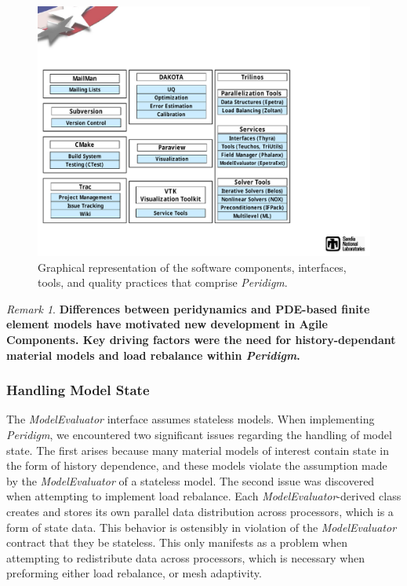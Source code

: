 \documentclass[pdf,ps2pdf,12pt,report]{SANDreport}
\theoremstyle{plain}
\theoremstyle{definition}
\theoremstyle{remark}
\newtheorem{rem}{Remark}[section]
\numberwithin{equation}{section}
\begin{document}
\begin{figure}[h!]
\begin{center}
	\includegraphics[width=\linewidth]{PeridigmComponents}
 \end{center}
 \caption{Graphical representation of the software components, interfaces, tools, and quality practices that comprise \emph{Peridigm}.}
\label{fig:PeridigmComponents}
\end{figure}

\begin{rem}
\textbf{Differences between peridynamics and PDE-based finite element models have motivated new development in Agile Components. Key driving factors were the need for history-dependant material models and load rebalance within \emph{Peridigm}.}
\end{rem}

\subsubsection{Handling Model State}

The \emph{ModelEvaluator} interface assumes stateless models. When implementing \emph{Peridigm}, we encountered two significant issues regarding the handling of model state. The first arises because many material models of interest contain state in the form of history dependence, and these models violate the assumption made by the \emph{ModelEvaluator} of a stateless model. The second issue was discovered when attempting to implement load rebalance. Each \emph{ModelEvaluator}-derived class creates and stores its own parallel data distribution across processors, which is a form of state data. This behavior is ostensibly in violation of the \emph{ModelEvaluator} contract that they be stateless. This only manifests as a problem when attempting to redistribute data across processors, which is necessary when preforming either load rebalance, or mesh adaptivity.
\end{document}
